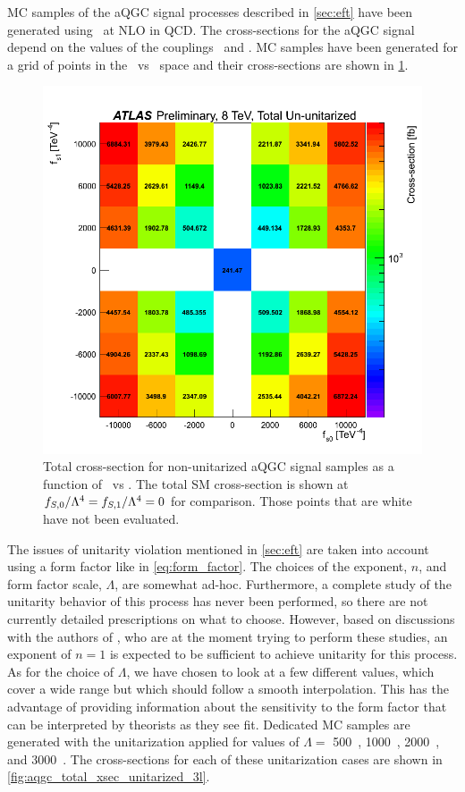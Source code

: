 
MC samples of the aQGC signal processes described in \sec\ref{sec:eft}
have been generated using \vbfnlo~at NLO in QCD.  %
The cross-sections for the aQGC signal depend on the values
of the couplings \fszero~and \fsone. MC samples have 
been generated for a grid of points in the \fszero~vs \fsone~space
and their cross-sections are shown in \fig\ref{fig:aqgc_total_xsec_ununitarized_3l}. %

\begin{figure}[ht!]
\centering
\includegraphics[width=.8\textwidth]{figures/aQGC/total_xsec/www_3l_aqgc_total_ununitarized_noratio.png}
\caption{Total cross-section for non-unitarized aQGC signal 
samples as a function of \fszero~vs \fsone.
The total SM cross-section is shown at $f_{S,0}/\Lambda^4=f_{S,1}/\Lambda^4=0$ for comparison.
Those points that are white have not been evaluated.  }
\label{fig:aqgc_total_xsec_ununitarized_3l}
\end{figure}

The issues of unitarity violation mentioned in \sec\ref{sec:eft} are taken
into account using a form factor like in \eqn\eqref{eq:form_factor}.
The choices of the exponent, $n$, and form factor scale, $\Lambda$, 
are somewhat ad-hoc. Furthermore, a complete study of the unitarity
behavior of this process has never been performed, so there are not
currently detailed prescriptions on what to choose. 
However, based on discussions with the authors of \vbfnlo, who
are at the moment trying to perform these studies, an exponent
of $n=1$ is expected to be sufficient to achieve unitarity 
for this process.  As for the choice of $\Lambda$, we have
chosen to look at a few different values, which cover a wide
range but which should follow a smooth interpolation. 
This has the advantage of providing information about the
sensitivity to the form factor that can be interpreted 
by theorists as they see fit. Dedicated MC samples
are generated with the unitarization applied for values
of $\Lambda =$ 500~\GeV, 1000~\GeV, 2000~\GeV, and 3000~\GeV.
The cross-sections for each of these unitarization cases
are shown in \fig\ref{fig:aqgc_total_xsec_unitarized_3l}.


